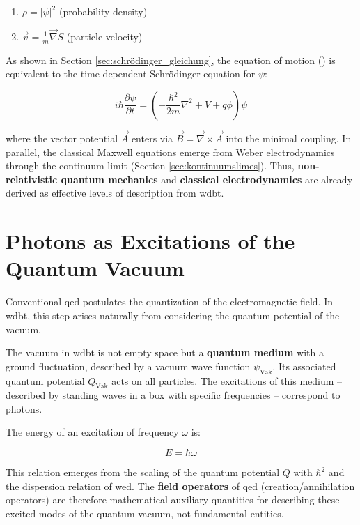 \begin{enumerate}
    \item $\rho=\left| \psi \right|^2$ (probability density)
    \item $\vec{v} = \frac{1}{m}\vec{\nabla}S$ (particle velocity)
\end{enumerate}

As shown in Section \ref{sec:schrödinger_gleichung}, the equation of motion () is equivalent to the time-dependent Schrödinger equation for $\psi$:

\begin{equation}
    i\hbar \frac{\partial \psi}{\partial t} = \left( -\frac{\hbar^2}{2m} \nabla^2 + V + q\phi \right) \psi
\end{equation}

where the vector potential $\vec{A}$ enters via $\vec{B} = \vec{\nabla} \times \vec{A}$ into the minimal coupling. In parallel, the classical Maxwell equations emerge from Weber electrodynamics through the continuum limit (Section \ref{sec:kontinuumslimes}). Thus, \textbf{non-relativistic quantum mechanics} and \textbf{classical electrodynamics} are already derived as effective levels of description from \gls{wdbt}.

\section{Photons as Excitations of the Quantum Vacuum}
Conventional \gls{qed} postulates the quantization of the electromagnetic field. In \gls{wdbt}, this step arises naturally from considering the quantum potential of the vacuum.

The vacuum in \gls{wdbt} is not empty space but a \textbf{quantum medium} with a ground fluctuation, described by a vacuum wave function $\psi_\text{Vak}$. Its associated quantum potential $Q_\text{Vak}$ acts on all particles. The excitations of this medium – described by standing waves in a box with specific frequencies – correspond to photons.

The energy of an excitation of frequency $\omega$ is:

\begin{equation}
    E = \hbar \omega
\end{equation}

This relation emerges from the scaling of the quantum potential $Q$ with $\hbar^2$ and the dispersion relation of \gls{wed}. The \textbf{field operators} of \gls{qed} (creation/annihilation operators) are therefore mathematical auxiliary quantities for describing these excited modes of the quantum vacuum, not fundamental entities.

